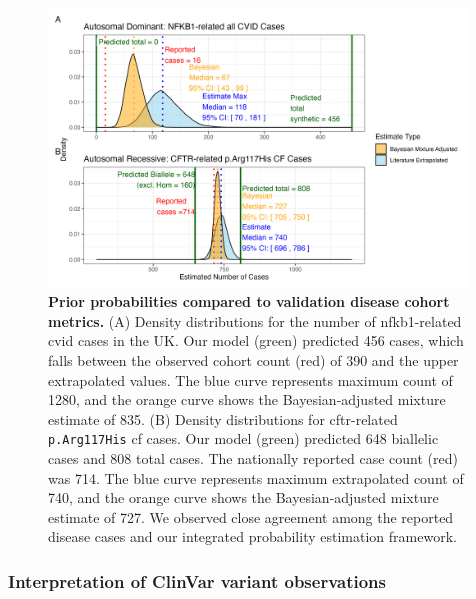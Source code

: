 \begin{figure}[ht]
  \centering
  \includegraphics[width=0.99\textwidth]{../images/validation_studies_bayesian_adjusted_estimates.png}
  \caption{\textbf{Prior probabilities compared to validation disease cohort metrics.}
  (A) Density distributions for the number of \ac{nfkb1}-related \ac{cvid} cases in the UK. 
  Our model (green) predicted 456 cases, which falls between the observed cohort count (red) of 390 and the upper extrapolated values.
  The blue curve represents maximum count of 1280, and the orange curve shows the Bayesian-adjusted mixture estimate of 835. 
(B) Density distributions for \ac{cftr}-related \texttt{p.Arg117His} \ac{cf} cases. 
Our model (green) predicted 648 biallelic cases and 808 total cases.
The nationally reported case count (red) was 714.
The blue curve represents maximum extrapolated count of 740, and the orange curve shows the Bayesian-adjusted mixture estimate of 727. We observed close agreement among the reported disease cases and our integrated probability estimation framework.}
  \label{fig:validation_studies_bayesian_adjusted_estimates}
\end{figure}




\FloatBarrier
\clearpage
\subsubsection{Interpretation of ClinVar variant observations}

